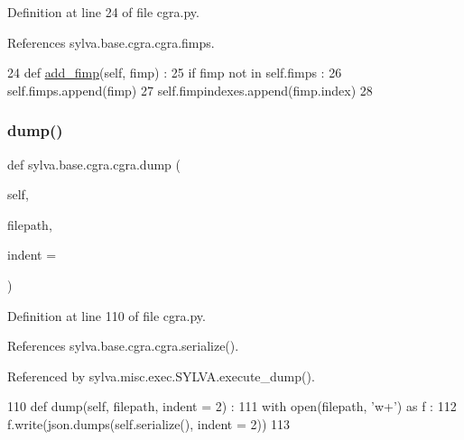 Definition at line 24 of file cgra.\+py.



References sylva.\+base.\+cgra.\+cgra.\+fimps.


\begin{DoxyCode}
24   \textcolor{keyword}{def }\hyperlink{namespacesylva_1_1base_1_1fimp_a82bf900d1f19a23480ce25d4055fa3d3}{add\_fimp}(self, fimp) :
25     \textcolor{keywordflow}{if} fimp \textcolor{keywordflow}{not} \textcolor{keywordflow}{in} self.fimps :
26       self.fimps.append(fimp)
27       self.fimpindexes.append(fimp.index)
28 
\end{DoxyCode}
\mbox{\label{classsylva_1_1base_1_1cgra_1_1cgra_a98e40701c2779ebe63f1669a4e68ed80}} 
\subsubsection{\texorpdfstring{dump()}{dump()}}
{\footnotesize\ttfamily def sylva.\+base.\+cgra.\+cgra.\+dump (\begin{DoxyParamCaption}\item[{}]{self,  }\item[{}]{filepath,  }\item[{}]{indent = {} }\end{DoxyParamCaption})}



Definition at line 110 of file cgra.\+py.



References sylva.\+base.\+cgra.\+cgra.\+serialize().



Referenced by sylva.\+misc.\+exec.\+S\+Y\+L\+V\+A.\+execute\+\_\+dump().


\begin{DoxyCode}
110   \textcolor{keyword}{def }dump(self, filepath, indent = 2) :
111     with open(filepath, \textcolor{stringliteral}{'w+'}) \textcolor{keyword}{as} f :
112       f.write(json.dumps(self.serialize(), indent = 2))
113 \end{DoxyCode}
\mbox{\label{classsylva_1_1base_1_1cgra_1_1cgra_a8a23d70c524344ab7046469b6f47ff1a}} 
